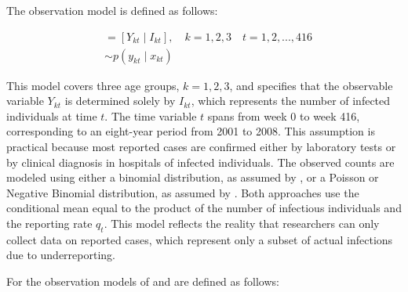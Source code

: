 \documentclass[10pt]{article}
\begin{document}
The observation model is defined as follows:
\vspace{-10mm}

\begin{align*}
    [Y_{kt} \mid X_{kt} = (S_{kt}, I_{kt}, R_{kt})] &= [Y_{kt} \mid I_{kt}], \quad k=1,2,3 \quad t=1,2,...,416 \\
    & \sim p(y_{kt} \mid x_{kt})
\end{align*}
\vspace{-10mm}

This model covers three age groups, \(k=1,2,3\), and specifies that the observable variable \(Y_{kt}\) is determined solely by \(I_{kt}\), which represents the number of infected individuals at time \(t\). The time variable \(t\) spans from week 0 to week 416, corresponding to an eight-year period from 2001 to 2008. This assumption is practical because most reported cases are confirmed either by laboratory tests or by clinical diagnosis in hospitals of infected individuals. The observed counts are modeled using either a binomial distribution, as assumed by \cite{wwr}, or a Poisson or Negative Binomial distribution, as assumed by \cite{stocks}. Both approaches use the conditional mean equal to the product of the number of infectious individuals and the reporting rate $q_t$. This model reflects the reality that researchers can only collect data on reported cases, which represent only a subset of actual infections due to underreporting. 

For the observation models of \cite{stocks} and \cite{wwr} are defined as follows:
\end{document}

